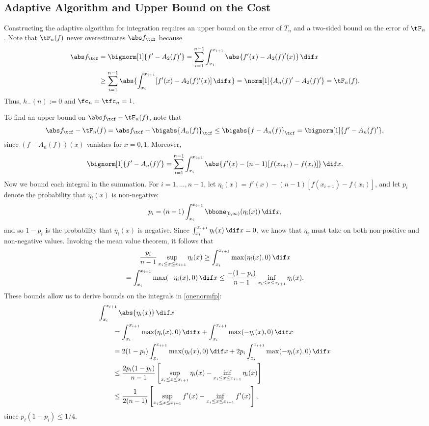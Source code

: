 \subsection{Adaptive Algorithm and Upper Bound on the Cost}

Constructing the adaptive algorithm for integration requires an upper bound on the error of $T_n$ and a two-sided bound on the error of $\tF_n$.  Note that $\tF_{n}(f)$ never overestimates $\Ftnorm{f}$ because
\begin{align*}
\Ftnorm{f} & = \bignorm[1]{f'-A_2(f)'}
= \sum_{i=1}^{n-1} \int_{x_i}^{x_{i+1}} \abs{f'(x) - A_2(f)'(x)} \, \dif x \\
& \ge \sum_{i=1}^{n-1} \abs{\int_{x_i}^{x_{i+1}} [f'(x) - A_2(f)'(x)] \, \dif x}=\norm[1]{A_n(f)'-A_2(f)'} = \tF_n(f).
\end{align*}
Thus, $h_{-}(n):=0$ and $\fc_n=\tfc_n=1$.

To find an upper bound on $\Ftnorm{f}-\tF_{n}(f)$, note that
\begin{equation*}
\Ftnorm{f} - \tF_{n}(f) = \Ftnorm{f} - \bigabs{A_n(f)}_{\tcf} \le \bigabs{f-A_n(f)}_{\tcf} = \bignorm[1]{f' -A_n(f)'},
\end{equation*}
since $(f-A_n(f))(x)$ vanishes for $x=0,1$.  Moreover,
\begin{equation} \label{onenormfp}
\bignorm[1]{f' -A_n(f)'} = \sum_{i=1}^{n-1} \int_{x_i}^{x_{i+1}} \abs{f'(x) -(n-1)[f(x_{i+1})-f(x_i)]} \, \dif x.
\end{equation}
Now we bound each integral in the summation.  For $i=1, \ldots, n-1$, let $\eta_i(x) = f'(x) -(n-1)[f(x_{i+1})-f(x_i)]$, and let $p_i$ denote the probability that $\eta_i(x)$ is non-negative:
\[
p_i = (n-1)\int_{x_i}^{x_{i+1}} \bbone_{[0,\infty)} (\eta_i(x)) \, \dif x,
\]
and so $1-p_i$ is the probability that $\eta_i(x)$ is negative.  Since $\int_{x_i}^{x_{i+1}} \eta_i(x) \, \dif x =0$, we know that $\eta_i$ must take on both non-positive and non-negative values.  Invoking the mean value theorem, it follows that
\begin{multline*}
\frac{p_i}{n-1} \sup_{x_i \le x \le x_{i+1}} \eta_i(x) \ge \int_{x_i}^{x_{i+1}} \max(\eta_i(x),0) \, \dif x \\
= \int_{x_i}^{x_{i+1}} \max(-\eta_i(x),0) \, \dif x \le \frac{-(1-p_i)}{n-1} \inf_{x_i \le x \le x_{i+1}} \eta_i(x) .
\end{multline*}
These bounds allow us to derive bounds on the integrals in \eqref{onenormfp}:
\begin{align*}
\MoveEqLeft{\int_{x_i}^{x_{i+1}} \abs{\eta_i(x)} \, \dif x} \\
 &= \int_{x_i}^{x_{i+1}} \max(\eta_i(x),0) \, \dif x + \int_{x_i}^{x_{i+1}} \max(-\eta_i(x),0) \, \dif x\\
&=2(1-p_i) \int_{x_i}^{x_{i+1}} \max(\eta_i(x),0) \, \dif x + 2p_i\int_{x_i}^{x_{i+1}} \max(-\eta_i(x),0) \, \dif x\\
&\le \frac{2p_i(1-p_i)}{n-1} \left[ \sup_{x_i \le x \le x_{i+1}} \eta_i(x) - \inf_{x_i \le x \le x_{i+1}} \eta_i(x) \right]\\
&\le\frac{1}{2(n-1)} \left[ \sup_{x_i \le x \le x_{i+1}} f'(x) - \inf_{x_i \le x \le x_{i+1}} f'(x) \right],
\end{align*}
since $p_i(1-p_i)\le 1/4$.

